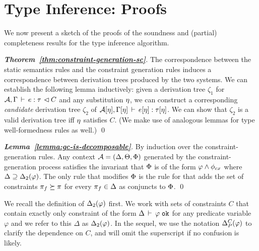 \section{Type Inference: Proofs}

We now present a sketch of the proofs of the soundness and (partial) completeness
results for the type inference algorithm.


\begin{proof}[\textbf{Theorem~\ref{thm:constraint-generation-sc}}]
The correspondence between the static semantics rules and the constraint generation
rules induces a correspondence between derivation trees produced by the
two systems.
We can establish the following lemma inductively:
given a derivation tree $\zeta_1$ for
${{\mathcal{A}},\Gamma} \, \vdash \, {e} : {\tau} \, \lhd {C}$
and any substitution $\eta$,
we can construct a corresponding \emph{candidate} derivation
tree $\zeta_2$ of ${\mathcal{A}}[\eta],\Gamma[\eta]\,\vdash\,e[\eta]:\tau[\eta]$.
We can show that $\zeta_2$ is a valid derivation tree iff $\eta$ satisfies $C$.
(We make use of analogous lemmas for type well-formedness rules as well.)
\qed
\end{proof}


\begin{proof}[\textbf{Lemma~\ref{lemma:gc-is-decomposable}}]
  By induction over the constraint-generation rules.
  Any context ${\mathcal{A}} = (\Delta,\Theta,\Phi)$ generated by the constraint-generation
  process satisfies the invariant that $\Phi$ is of the form $\varphi \wedge \phi_{cx}$
  where $\Delta \supseteq {\Delta_2}(\varphi)$.
  The only rule that modifies $\Phi$ is the rule for 
  that adds the set of constraints $\pi_f \succeq \pi$ for every $\pi_f \in \Delta$
  as conjuncts to $\Phi$.
\qed
\end{proof}

We recall the definition of ${\Delta_2}(\varphi)$ first. We work with sets of constraints $C$ that
contain exactly only constraint of the form  $\Delta\,\vdash\,\varphi \; \texttt{ok}$ for any predicate variable $\varphi$
and we refer to this $\Delta$ as ${\Delta_2}(\varphi)$. In the sequel, we use the notation
$\Delta_P^C(\varphi)$ to clarify the dependence on $C$, and will omit the superscript if no confusion
is likely.

